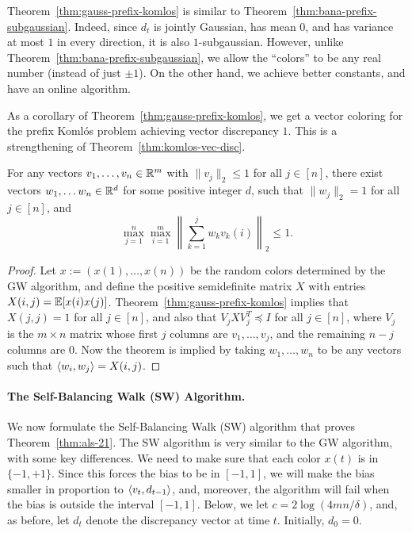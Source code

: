 \begin{remark}
    Theorem~\ref{thm:gauss-prefix-komlos} is similar to Theorem~\ref{thm:bana-prefix-subgaussian}. Indeed, since $d_t$ is jointly Gaussian, has mean $0$, and has variance at most $1$ in every direction, it is also $1$-subgaussian. However, unlike Theorem~\ref{thm:bana-prefix-subgaussian}, we allow the ``colors'' to be any real number (instead of just $\pm 1$). On the other hand, we achieve better constants, and have an online algorithm. 
\end{remark}

\smallskip

 As a corollary of Theorem~\ref{thm:gauss-prefix-komlos}, we get a vector coloring for the prefix Koml\'os problem achieving vector discrepancy $1$. This is a strengthening of Theorem~\ref{thm:komlos-vec-disc}. 

\begin{theorem}\label{thm:vec-prefix-komlos}
    For any vectors $v_1, \ldots, v_n \in \mathbb{R}^m$ with $\|v_j\|_2 \le 1$ for all $j \in [n]$, there exist vectors $w_1, \ldots w_n \in \mathbb{R}^d$ for some positive integer $d$, such that $\|w_j\|_2 = 1$ for all $j \in [n]$, and 
    \[
    \max_{j=1}^n \max_{i = 1}^m \left\|\sum_{k = 1}^j w_k v_k(i)\right\|_2 \le 1.
    \]
\end{theorem}
\begin{proof}
    Let $x := (x(1), \ldots, x(n))$ be the random colors determined by the GW algorithm, and define the positive semidefinite matrix $X$ with entries $X(i,j) = \mathbb{E}[x(i)x(j)]$. Theorem~\ref{thm:gauss-prefix-komlos} implies that $X(j,j) = 1$ for all $j \in [n]$, and also that $V_j X V_j^T\preceq I$ for all $j \in [n]$, where $V_j$ is the $m\times n$ matrix whose first $j$ columns are $v_1, \ldots, v_j$, and the remaining $n-j$ columns are $0$. Now the theorem is implied by taking $w_1, \ldots, w_n$ to be any vectors such that $\langle w_i,w_j\rangle = X(i,j)$. 
\end{proof}

\paragraph{The Self-Balancing Walk (SW) Algorithm.}
We now formulate the Self-Balancing Walk (SW) algorithm that proves Theorem~\ref{thm:als-21}. The SW algorithm is very similar to the GW algorithm, with some key differences. We need to make sure that each color $x(t)$ is in $\{-1,+1\}$. Since this forces the bias to be in $[-1,1]$, we will make the bias smaller in proportion to $\langle v_t, d_{t-1}\rangle$, and, moreover, the algorithm will fail when the bias is outside the interval $[-1,1]$. Below, we let $c = 2\log (4mn/\delta)$, and, as before, let $d_t$ denote the discrepancy vector at time $t$. Initially, $d_0=0$.\\



